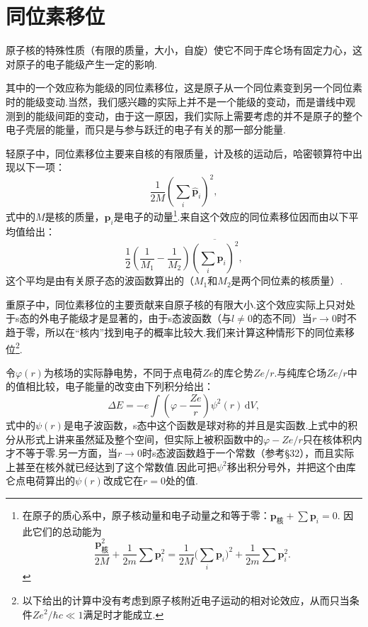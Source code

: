 \section{同位素移位}

原子核的特殊性质（有限的质量，大小，自旋）使它不同于库仑场有固定力心，这对原子的电子能级产生一定的影响.

其中的一个效应称为能级的同位素移位，这是原子从一个同位素变到另一个同位素时的能级变动.当然，我们感兴趣的实际上并不是一个能级的变动，而是谱线中观测到的能级间距的变动，由于这一原因，我们实际上需要考虑的并不是原子的整个电子壳层的能量，而只是与参与跃迁的电子有关的那一部分能量.

轻原子中，同位素移位主要来自核的有限质量，计及核的运动后，哈密顿算符中出现以下一项：
\begin{equation*}
  \frac{1}{2M}\left(\sum_i\hat{\boldsymbol{p}}_i\right)^2,
\end{equation*}
式中的$M$是核的质量，$\boldsymbol{p}_i$是电子的动量\footnote{在原子的质心系中，原子核动量和电子动量之和等于零：$\boldsymbol{p}_{\text{核}}+\sum\boldsymbol{p}_i=0$. 因此它们的总动能为
\begin{equation*}
  \frac{\boldsymbol{p}_{\text{核}}^2}{2M}
  +\frac{1}{2m}\sum\boldsymbol{p}_i^2
  =\frac{1}{2M}\biggl(\sum_i\boldsymbol{p}_i\biggr)^2
  +\frac{1}{2m}\sum\boldsymbol{p}_i^2.
\end{equation*}}.来自这个效应的同位素移位因而由以下平均值给出：
\begin{equation}
  \frac{1}{2}\left(\frac{1}{M_1}-\frac{1}{M_2}\right)
  \overline{\left(\sum_i\boldsymbol{p}_i\right)^2},
\end{equation}
这个平均是由有关原子态的波函数算出的（$M_1$和$M_2$是两个同位素的核质量）.

重原子中，同位素移位的主要贡献来自原子核的有限大小.这个效应实际上只对处于s态的外电子能级才是显著的，由于s态波函数（与$l\neq0$的态不同）当$r\to0$时不趋于零，所以在“核内”找到电子的概率比较大.我们来计算这种情形下的同位素移位\footnote{以下给出的计算中没有考虑到原子核附近电子运动的相对论效应，从而只当条件$Ze^2/\hbar c\ll1$满足时才能成立.}.

令$\varphi(r)$为核场的实际静电势，不同于点电荷$Ze$的库仑势$Ze/r$.与纯库仑场$Ze/r$中的值相比较，电子能量的改变由下列积分给出：
\begin{equation}
  \Delta E=-e\int\left(\varphi-\frac{Ze}{r}\right)\psi^2(r)\,\mathrm{d}V,
\end{equation}
式中的$\psi(r)$是电子波函数，s态中这个函数是球对称的并且是实函数.上式中的积分从形式上讲来虽然延及整个空间，但实际上被积函数中的$\varphi-Ze/r$只在核体积内才不等于零.另一方面，当$r\to0$时s态波函数趋于一个常数（参考§32），而且实际上甚至在核外就已经达到了这个常数值.因此可把$\psi^2$移出积分号外，并把这个由库仑点电荷算出的$\psi(r)$改成它在$r=0$处的值.

